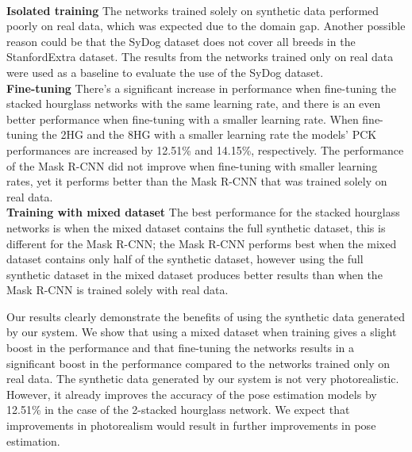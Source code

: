 \documentclass[final]{cvpr}
\begin{document}
\\\textbf{Isolated training} The networks trained solely on synthetic data performed poorly on real data, which was expected due to the domain gap. Another possible reason could be that the SyDog dataset does not cover all breeds in the StanfordExtra dataset. The results from the networks trained only on real data were used as a baseline to evaluate the use of the SyDog dataset.
\\\textbf{Fine-tuning}
There's a significant increase in performance when fine-tuning the stacked hourglass networks with the same learning rate, and there is an even better performance when fine-tuning with a smaller learning rate. When fine-tuning the 2HG and the 8HG with a smaller learning rate the models' PCK performances are increased by 12.51\% and 14.15\%, respectively. The performance of the Mask R-CNN did not improve when fine-tuning with smaller learning rates, yet it performs better than the Mask R-CNN that was trained solely on real data. \\\textbf{Training with mixed dataset} The best performance for the stacked hourglass networks is when the mixed dataset contains the full synthetic dataset, this is different for the Mask R-CNN; the Mask R-CNN performs best when the mixed dataset contains only half of the synthetic dataset, however using the full synthetic dataset in the mixed dataset produces better results than when the Mask R-CNN is trained solely with real data. 


Our results clearly demonstrate the benefits of using the synthetic data generated by our system. We show that using a mixed dataset when training gives a slight boost in the performance and that fine-tuning the networks results in a significant boost in the performance compared to the networks trained only on real data. 
The synthetic data generated by our system is not very photorealistic. However, it already improves the accuracy of the pose estimation models by 12.51\% in the case of the 2-stacked hourglass network. We expect that improvements in photorealism would result in further improvements in pose estimation. 
\end{document}
